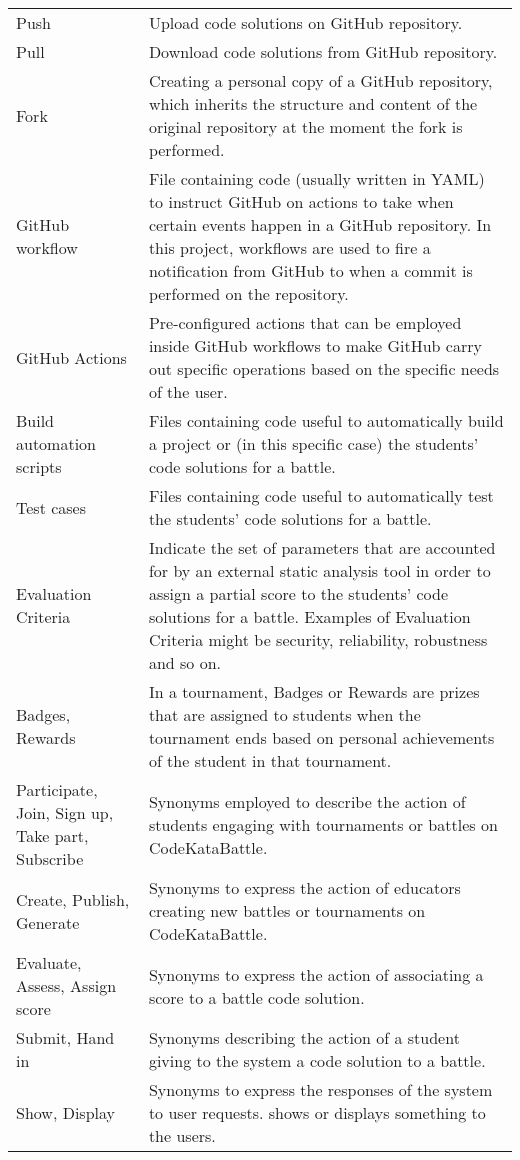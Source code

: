 \begin{longtable}[]{m{5cm} m{9cm}}
	Push & Upload code solutions on GitHub repository.\\
	
	Pull & Download code solutions from GitHub repository.\\
	
	Fork & Creating a personal copy of a GitHub repository, which inherits the structure and content of the original repository at the moment the fork is performed.\\
	
	GitHub workflow & File containing code (usually written in YAML) to instruct GitHub on actions to take when certain events happen in a GitHub repository. In this project, workflows are used to fire a notification from GitHub to \app when a commit is performed on the repository.\\
	
	GitHub Actions & Pre-configured actions that can be employed inside GitHub workflows to make GitHub carry out specific operations based on the specific needs of the user. \\
	
	Build automation scripts & Files containing code useful to automatically build a project or (in this specific case) the students' code solutions for a battle.\\
	
	Test cases & Files containing code useful to automatically test the students' code solutions for a battle.\\
	
	Evaluation Criteria & Indicate the set of parameters that are accounted for by an external static analysis tool in order to assign a partial score to the students' code solutions for a battle. Examples of Evaluation Criteria might be security, reliability, robustness and so on.\\
	
	Badges, Rewards & In a tournament, Badges or Rewards are prizes that are assigned to students when the tournament ends based on personal achievements of the student in that tournament.\\
	
	Participate, Join, Sign up, Take part, Subscribe & Synonyms employed to describe the action of students engaging with tournaments or battles on CodeKataBattle.\\
	
	Create, Publish, Generate & Synonyms to express the action of educators creating new battles or tournaments on CodeKataBattle. \\
	
	Evaluate, Assess, Assign score & Synonyms to express the action of associating a score to a battle code solution.\\
	
	Submit, Hand in & Synonyms describing the action of a student giving to the system a code solution to a battle.\\
	
	Show, Display & Synonyms to express the responses of the system to user requests. \app shows or displays something to the users.
	

\end{longtable}
\setlength{\tabcolsep}{6pt}

